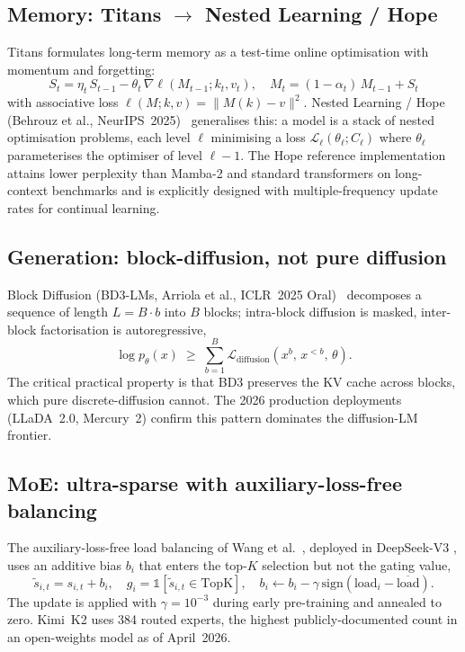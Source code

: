 \documentclass[10pt,a4paper]{article}
\theoremstyle{remark}
\begin{document}
\subsection{Memory: Titans $\to$ Nested Learning / Hope}
\label{sec:memory}

Titans \cite{Titans2024} formulates long-term memory as a test-time
online optimisation with momentum and forgetting:
\begin{equation}
 S_t = \eta_t\, S_{t-1} - \theta_t\, \nabla \ell(M_{t-1}; k_t, v_t),
 \quad M_t = (1-\alpha_t)\, M_{t-1} + S_t
 \label{eq:titans}
\end{equation}
with associative loss $\ell(M; k, v) = \|M(k) - v\|^2$. Nested
Learning / Hope (Behrouz et al.,
NeurIPS~2025)~\cite{NestedLearning2025} generalises this: a model is
a stack of nested optimisation problems, each level $\ell$
minimising a loss $\mathcal{L}_\ell(\theta_\ell; C_\ell)$ where
$\theta_\ell$ parameterises the optimiser of level $\ell - 1$. The
Hope reference implementation attains lower perplexity than
Mamba-2 and standard transformers on long-context benchmarks and is
explicitly designed with multiple-frequency update rates for
continual learning.

\subsection{Generation: block-diffusion, not pure diffusion}
\label{sec:diffusion}

Block Diffusion (BD3-LMs, Arriola et al., ICLR~2025
Oral)~\cite{BlockDiffusion2025} decomposes a sequence of length
$L = B \cdot b$ into $B$ blocks; intra-block diffusion is masked,
inter-block factorisation is autoregressive,
\begin{equation}
 \log p_\theta(x) \;\ge\;
 \sum_{b=1}^{B} \mathcal{L}_{\mathrm{diffusion}}
 \!\left( x^{b},\, x^{<b},\, \theta \right).
 \label{eq:bd3}
\end{equation}
The critical practical property is that BD3 preserves the KV cache
across blocks, which pure discrete-diffusion cannot. The 2026
production deployments (LLaDA~2.0, Mercury~2) confirm this pattern
dominates the diffusion-LM frontier.

\subsection{MoE: ultra-sparse with auxiliary-loss-free balancing}
\label{sec:moe}

The auxiliary-loss-free load balancing of Wang et
al.~\cite{AuxLossFreeMoE2024}, deployed in DeepSeek-V3
\cite{DeepSeekV3}, uses an additive bias $b_i$ that enters the
top-$K$ selection but not the gating value,
\begin{equation}
 \tilde s_{i,t} = s_{i,t} + b_i,
 \quad g_i = \mathbb{1}\!\left[ \tilde s_{i,t} \in \mathrm{TopK} \right],
 \quad b_i \leftarrow b_i - \gamma\,
   \mathrm{sign}(\mathrm{load}_i - \overline{\mathrm{load}}).
 \label{eq:auxfree}
\end{equation}
The update is applied with $\gamma = 10^{-3}$ during early
pre-training and annealed to zero. Kimi~K2
\cite{KimiK2} uses 384 routed experts, the highest
publicly-documented count in an open-weights model as of
April~2026.
\end{document}
